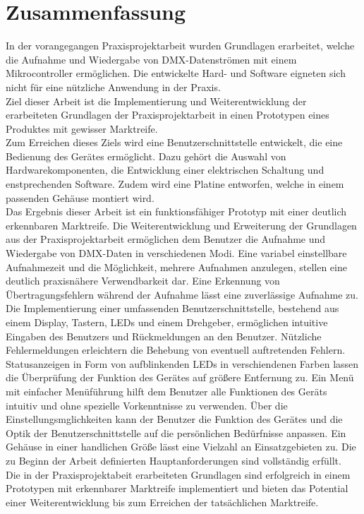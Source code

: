 \newpage
\section{Zusammenfassung}
In der vorangegangen Praxisprojektarbeit wurden Grundlagen erarbeitet, welche die Aufnahme und Wiedergabe von DMX-Datenströmen mit einem Mikrocontroller ermöglichen. Die entwickelte Hard- und Software eigneten sich nicht für eine nützliche Anwendung in der Praxis.\\
Ziel dieser Arbeit ist die Implementierung und Weiterentwicklung der erarbeiteten Grundlagen der Praxisprojektarbeit in einen Prototypen eines Produktes mit gewisser Marktreife.\\
Zum Erreichen dieses Ziels wird eine Benutzerschnittstelle entwickelt, die eine Bedienung des Gerätes ermöglicht. Dazu gehört die Auswahl von Hardwarekomponenten, die Entwicklung einer elektrischen Schaltung und enstprechenden Software. Zudem wird eine Platine entworfen, welche in einem passenden Gehäuse montiert wird.\\
Das Ergebnis dieser Arbeit ist ein funktionsfähiger Prototyp mit einer deutlich erkennbaren Marktreife. Die Weiterentwicklung und Erweiterung der Grundlagen aus der Praxisprojektarbeit ermöglichen dem Benutzer die Aufnahme und Wiedergabe von DMX-Daten in verschiedenen Modi. Eine variabel einstellbare Aufnahmezeit und die Möglichkeit, mehrere Aufnahmen anzulegen, stellen eine deutlich praxisnähere Verwendbarkeit dar. Eine Erkennung von Übertragungsfehlern während der Aufnahme lässt eine zuverlässige Aufnahme zu. Die Implementierung einer umfassenden Benutzerschnittstelle, bestehend aus einem Display, Tastern, LEDs und einem Drehgeber, ermöglichen intuitive Eingaben des Benutzers und Rückmeldungen an den Benutzer. Nützliche Fehlermeldungen erleichtern die Behebung von eventuell auftretenden Fehlern. Statusanzeigen in Form von aufblinkenden LEDs in verschiendenen Farben lassen die Überprüfung der Funktion des Gerätes auf größere Entfernung zu. Ein Menü mit einfacher Menüführung hilft dem Benutzer alle Funktionen des Geräts intuitiv und ohne spezielle Vorkenntnisse zu verwenden. Über die Einstellungsmglichkeiten kann der Benutzer die Funktion des Gerätes und die Optik der Benutzerschnittstelle auf die persönlichen Bedürfnisse anpassen. Ein Gehäuse in einer handlichen Größe lässt eine Vielzahl an Einsatzgebieten zu. Die zu Beginn der Arbeit definierten Hauptanforderungen sind vollständig erfüllt.\\%
Die in der Praxisprojektabeit erarbeiteten Grundlagen sind erfolgreich in einem Prototypen mit erkennbarer Marktreife implementiert und bieten das Potential einer Weiterentwicklung bis zum Erreichen der tatsächlichen Marktreife. 
